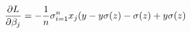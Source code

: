 \documentclass[preview]{standalone}
\begin{document}
\begin{align*}
\special{dvisvgm:raw <g id='unique000'>}\frac{\partial{L}}{\partial\beta_j}=-\frac{1}{n}\sigma^n_{i=1}x_j(y-y\sigma(z)-\sigma(z)+y\sigma(z)\special{dvisvgm:raw </g>}
\end{align*}
\end{document}
